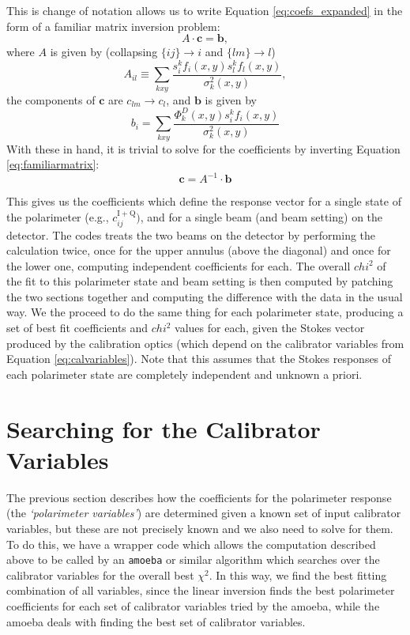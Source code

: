 \documentclass[11pt]{article}
\begin{document}
This is change of notation allows us to write Equation \ref{eq:coefs_expanded} in the form of a familiar matrix inversion problem:
\begin{equation}\label{eq:familiarmatrix}
	A\cdot \mathbf{c} = \mathbf{b},
\end{equation}
where $A$ is given by (collapsing $\{ij\}\rightarrow i$ and $\{lm\}\rightarrow l$)
\begin{equation}
	A_{il} \equiv \sum_{kxy}\frac{s^k_i f_i(x,y) s^k_l f_l(x,y)}{\sigma^2_k(x,y)},
\end{equation}
the components of $\mathbf{c}$ are $c_{lm}\rightarrow c_l$, and $\mathbf{b}$ is given by
\begin{equation}
	b_i = \sum_{kxy}\frac{\Phi^D_k(x,y) s^k_i f_i(x,y)}{\sigma^2_k(x,y)}
\end{equation}
With these in hand, it is trivial to solve for the coefficients by inverting Equation \ref{eq:familiarmatrix}:
\begin{equation}
	\mathbf{c} = A^{-1}\cdot\mathbf{b}
\end{equation}

This gives us the coefficients which define the response vector for a single state of the polarimeter (e.g., $c^{\mathrm{I+Q}}_{ij})$, and for a single beam (and beam setting) on the detector. The codes treats the two beams on the detector by performing the calculation twice, once for the upper annulus (above the diagonal) and once for the lower one, computing independent coefficients for each. The overall $chi^2$ of the fit to this polarimeter state and beam setting is then computed by patching the two sections together and computing the difference with the data in the usual way. We the proceed to do the same thing for each polarimeter state, producing a set of best fit coefficients and $chi^2$ values for each, given the Stokes vector produced by the calibration optics (which depend on the calibrator variables from Equation \ref{eq:calvariables}). Note that this assumes that the Stokes responses of each polarimeter state are completely independent and unknown a priori.

\section{Searching for the Calibrator Variables}

The previous section describes how the coefficients for the polarimeter response (the {\em `polarimeter variables'}) are determined given a known set of input calibrator variables, but these are not precisely known and we also need to solve for them. To do this, we have a wrapper code which allows the computation described above to be called by an \texttt{amoeba} or similar algorithm which searches over the calibrator variables for the overall best $\chi^2$. In this way, we find the best fitting combination of all variables, since the linear inversion finds the best polarimeter coefficients for each set of calibrator variables tried by the amoeba, while the amoeba deals with finding the best set of calibrator variables. 
\end{document}
